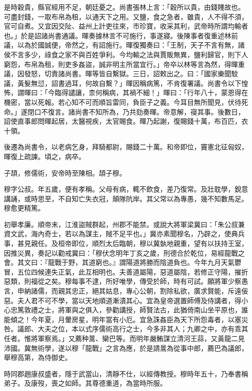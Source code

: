 \begin{pinyinscope}
是時穀貴，縣官經用不足，朝廷憂之。尚書張林上言：「穀所以貴，由錢賤故也。可盡封錢，一取布帛為租，以通天下之用。又鹽，食之急者，雖貴，人不得不須，官可自煮。又宜因交阯、益州上計吏往來，市珍寶，收采其利，武帝時所謂均輸者也。」於是詔諸尚書通議。暉奏據林言不可施行，事遂寢。後陳事者復重述林前議，以為於國誠便，帝然之，有詔施行。暉復獨奏曰：「王制，天子不言有無，諸侯不言多少，祿食之家不與百姓爭利。今均輸之法與賈販無異，鹽利歸官，則下人窮怨，布帛為租，則吏多姦盜，誠非明主所當宜行。」帝卒以林等言為然，得暉重議，因發怒，切責諸尚書。暉等皆自繫獄。三日，詔敕出之。曰：「國家樂聞駮議，黃髮無愆，詔書過耳，何故自繫？」暉因稱病篤，不肯復署議。尚書令以下惶怖，謂暉曰：「今臨得譴讓，柰何稱病，其禍不細！」暉曰：「行年八十，蒙恩得在機密，當以死報。若心知不可而順旨雷同，負臣子之義。今耳目無所聞見，伏待死命。」遂閉口不復言。諸尚書不知所為，乃共劾奏暉。帝意解，寑其事。後數日，詔使直事郎問暉起居，太醫視疾，太官賜食。暉乃起謝，復賜錢十萬，布百匹，衣十領。

後遷為尚書令，以老病乞身，拜騎都尉，賜錢二十萬。和帝即位，竇憲北征匈奴，暉復上疏諫。頃之，病卒。

子頡，修儒術，安帝時至陳相。頡子穆。

穆字公叔。年五歲，便有孝稱。父母有病，輒不飲食，差乃復常。及壯耽學，銳意講誦，或時思至，不自知亡失衣冠，顛隊阬岸。其父常以為專愚，幾不知數馬足。穆愈更精篤。

初舉孝廉。順帝末，江淮盜賊群起，州郡不能禁。或說大將軍梁冀曰：「朱公叔兼資文武，海內奇士，若以為謀主，賊不足平也。」冀亦素聞穆名，乃辟之，使典兵事，甚見親任。及桓帝即位，順烈太后臨朝，穆以冀埶地親重，望有以扶持王室，因推災異，奏記以勸戒冀曰：「穆伏念明年丁亥之歲，刑德合於乾位，易經龍戰之會。其文曰：『龍戰于野，其道窮也。』謂陽道將勝而陰道負也。今年九月天氣鬱冒，五位四候連失正氣，此互相明也。夫善道屬陽，惡道屬陰，若修正守陽，摧折惡類，則福從之矣。穆每事不逮，所好唯學，傳受於師，時有可試。願將軍少察愚言，申納諸儒，而親其忠正，絕其姑息，專心公朝，割除私欲，廣求賢能，斥遠佞惡。夫人君不可不學，當以天地順道漸漬其心。宜為皇帝選置師傅及侍講者，得小心忠篤敦禮之士，將軍與之俱入，參勸講授，師賢法古，此猶倚南山坐平原也，誰能傾之！今年夏，月暈房星，明年當有小厄。宜急誅姦臣為天下所怨毒者，以塞災咎。議郎、大夫之位，本以式序儒術高行之士，今多非其人；九卿之中，亦有乖其任者。惟將軍察焉。」又薦种暠、欒巴等。而明年嚴鮪謀立清河王蒜，又黃龍二見沛國。冀無術學，遂以穆「龍戰」之言為應，於是請暠為從事中郎，薦巴為議郎，舉穆高第，為侍御史。

時同郡趙康叔盛者，隱于武當山，清靜不仕，以經傳教授。穆時年五十，乃奉書稱弟子。及康歿，喪之如師。其尊德重道，為當時所服。


\end{pinyinscope}

